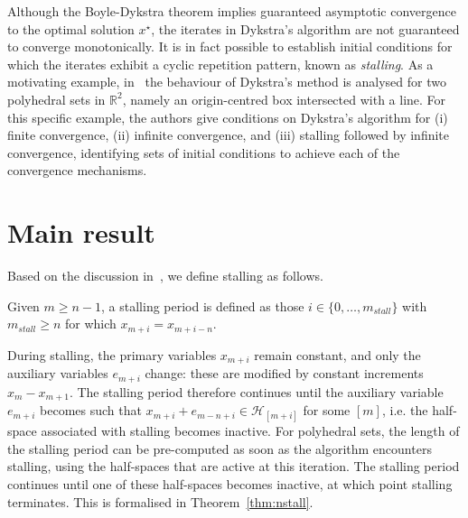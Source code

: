 \documentclass[onecolumn]{autart}
\begin{document}

Although the Boyle-Dykstra theorem implies guaranteed asymptotic convergence to the optimal solution $x^\star$, the iterates in Dykstra's algorithm are not guaranteed to converge monotonically. It is in fact possible to establish initial conditions for which the iterates exhibit a cyclic repetition pattern, known as \emph{stalling}.
As a motivating example, in~\cite{DYKSTRASTALLING} the behaviour of Dykstra's method is analysed for two polyhedral sets in $\mathbb{R}^2$, namely an origin-centred box intersected with a line. For this specific example, the authors give conditions on Dykstra's algorithm for (i) finite convergence, (ii) infinite convergence, and (iii) stalling followed by infinite convergence, identifying sets of initial conditions to achieve each of the convergence mechanisms.

\section{Main result}
\label{sec:main_result}

Based on the discussion in~\cite{DYKSTRASTALLING}, we define stalling as follows.

\begin{defn}[Stalling]\label{def:stalling}
Given $m\geq n-1$, a stalling period is defined as those $i\in\lbrace 0,\dots,m_{stall}\rbrace$ with $m_{stall}\geq n$ for which $x_{m+i}=x_{m+i-n}$.
\end{defn}

During stalling, the primary variables $x_{m+i}$ remain constant, and only the auxiliary variables $e_{m+i}$ change: these are modified by constant increments $x_m-x_{m+1}$. The stalling period therefore continues until the auxiliary variable $e_{m+i}$ becomes such that $x_{m+i}+e_{m-n+i}\in\mathcal{H}_{[m+i]}$ for some $[m]$, i.e. the half-space associated with stalling becomes inactive. For polyhedral sets, the length of the stalling period can be pre-computed as soon as the algorithm encounters stalling, using the half-spaces that are active at this iteration. The stalling period continues until one of these half-spaces becomes inactive, at which point stalling terminates. This is formalised in Theorem~\ref{thm:nstall}.
\end{document}
